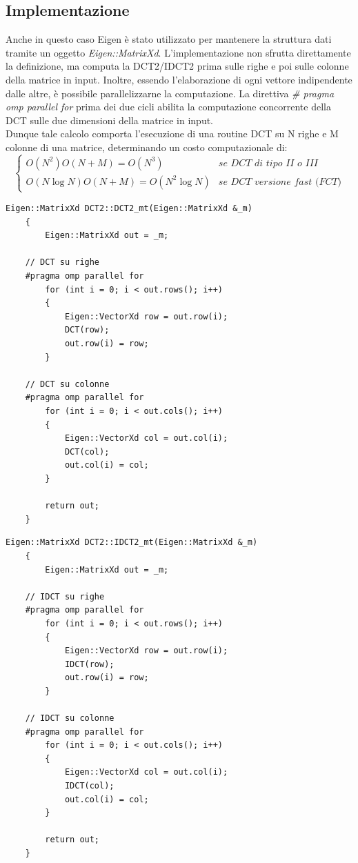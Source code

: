 \documentclass[a4paper,12pt]{report}
\begin{document}
\subsection*{Implementazione}
Anche in questo caso Eigen è stato utilizzato per mantenere la struttura dati tramite un oggetto \textit{Eigen::MatrixXd}. L'implementazione non sfrutta direttamente la definizione, ma computa la DCT2/IDCT2 prima sulle righe e poi sulle colonne della matrice in input. Inoltre, essendo l'elaborazione di ogni vettore indipendente dalle altre, è possibile parallelizzarne la computazione. La direttiva \textit{\# pragma omp parallel for} prima dei due cicli abilita la computazione concorrente della DCT sulle due dimensioni della matrice in input. \\
Dunque tale calcolo comporta l'esecuzione di una routine DCT su N righe e M colonne di una matrice, determinando un costo computazionale di:\\
\[ 
  \begin{cases} 
   O(N^2) O(N+M) = O(N^3) & \textit{se DCT di tipo II o III} \\
   O(N\log{N}) O(N+M) = O(N^2\log{N}) & \textit{se DCT versione fast (FCT)} 
  \end{cases}
\]
\hfill \break
\hfill \break
\hfill \break
\hfill \break
\begin{lstlisting}[caption={Funzione di calcolo DCT2},captionpos=b]
	Eigen::MatrixXd DCT2::DCT2_mt(Eigen::MatrixXd &_m)
	{
		Eigen::MatrixXd out = _m;
	
	// DCT su righe
	#pragma omp parallel for
		for (int i = 0; i < out.rows(); i++)
		{
			Eigen::VectorXd row = out.row(i);
			DCT(row);
			out.row(i) = row;
		}
	
	// DCT su colonne
	#pragma omp parallel for
		for (int i = 0; i < out.cols(); i++)
		{
			Eigen::VectorXd col = out.col(i);
			DCT(col);
			out.col(i) = col;
		}
	
		return out;
	}
\end{lstlisting}
\hfill \break
\begin{lstlisting}[caption={Funzione di calcolo IDCT2},captionpos=b]
	Eigen::MatrixXd DCT2::IDCT2_mt(Eigen::MatrixXd &_m)
	{
		Eigen::MatrixXd out = _m;
	
	// IDCT su righe
	#pragma omp parallel for
		for (int i = 0; i < out.rows(); i++)
		{
			Eigen::VectorXd row = out.row(i);
			IDCT(row);
			out.row(i) = row;
		}
	
	// IDCT su colonne
	#pragma omp parallel for
		for (int i = 0; i < out.cols(); i++)
		{
			Eigen::VectorXd col = out.col(i);
			IDCT(col);
			out.col(i) = col;
		}
	
		return out;
	}
\end{lstlisting}
\newpage
\end{document}
